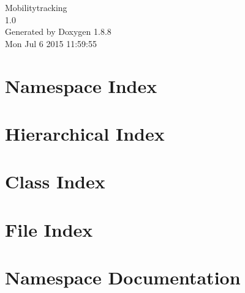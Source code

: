 \documentclass[twoside]{book}
\newcommand{\+}{\discretionary{\mbox{\scriptsize$\hookleftarrow$}}{}{}}
\newcommand{\clearemptydoublepage}{%
  \newpage{\pagestyle{empty}\cleardoublepage}%
}
\begin{document}
\hypersetup{pageanchor=false,
             bookmarks=true,
             bookmarksnumbered=true,
             pdfencoding=unicode
            }
\begin{titlepage}
\vspace*{7cm}
\begin{center}%
{\Large Mobilitytracking \\[1ex]\large 1.\+0 }\\
\vspace*{1cm}
{\large Generated by Doxygen 1.8.8}\\
\vspace*{0.5cm}
{\small Mon Jul 6 2015 11:59:55}\\
\end{center}
\end{titlepage}
\clearemptydoublepage
\tableofcontents
\clearemptydoublepage
{}
\hypersetup{pageanchor=true}

\chapter{Namespace Index}

\chapter{Hierarchical Index}

\chapter{Class Index}

\chapter{File Index}

\chapter{Namespace Documentation}






\end{document}
